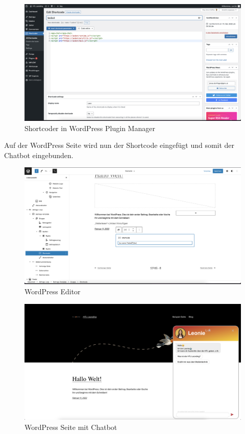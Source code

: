 \begin{figure}[hbt!]
    \centering
    \includegraphics[scale=0.2]{pics/shortcoder}
    \caption{Shortcoder in WordPress Plugin Manager}
    \label{fig:impl:shortcoder}
\end{figure}

Auf der WordPress Seite wird nun der Shortcode eingefügt und somit der Chatbot eingebunden.

\begin{figure}[hbt!]
    \centering
    \includegraphics[scale=0.2]{pics/wordpressedit}
    \caption{WordPress Editor}
    \label{fig:impl:wordpressedit}
\end{figure}

\begin{figure}[hbt!]
    \centering
    \includegraphics[scale=0.2]{pics/wordpresspage}
    \caption{WordPress Seite mit Chatbot}
    \label{fig:impl:wordpresspage}
\end{figure}

